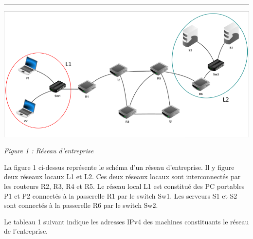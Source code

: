 \documentclass[11pt,a4paper]{article}
\newenvironment{head}[1]
{
	\setlength{\fboxsep}{-0.5cm}\setlength{\fboxrule}{0pt} 
	\framebox[18cm]{
		\begin{Huge}
			\textbf{#1}\hfill
		\end{Huge}			  
	}
}
{\newline \rule{\linewidth}{1pt}}
\begin{document}
\begin{head}
{Exercice}
\end{head}


\begin{center}
\includegraphics[scale=0.8]{../img/21-nsij1me1_ex3.png}

\textit{Figure 1 : Réseau d'entreprise}
\end{center}

La figure 1 ci-dessus représente le schéma d'un réseau d'entreprise. Il y figure deux réseaux locaux L1 et L2. Ces deux réseaux locaux sont interconnectés par les routeurs R2, R3, R4 et R5. Le réseau local L1 est constitué des PC portables P1 et P2 connectés à la passerelle R1 par le switch Sw1. Les serveurs S1 et S2 sont connectés à la passerelle R6 par le switch Sw2.

Le tableau 1 suivant indique les adresses IPv4 des machines constituants le réseau de l'entreprise.
\end{document}
